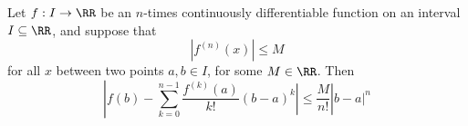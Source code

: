 

\begin{proposition}
Let $f: I\to\RR$ be an $n$-times continuously differentiable function 
on an interval $I\subseteq\RR$, and suppose that 
$$
\left| f^{(n)}(x) \right| \leq M
$$
for all $x$ between two points $a,b\in I$, for some $M\in\RR$. Then 
$$
\left| f(b) - \sum_{k=0}^{n-1} \frac{f^{(k)}(a)}{k!}(b-a)^k | \leq \frac{M}{n!}|b-a|^n
$$
\end{proposition}

